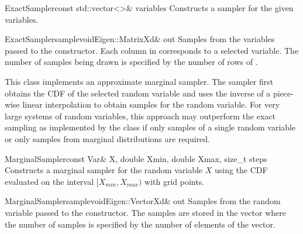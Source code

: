 \documentclass[a4paper, 10pt]{paper}
\begin{document}
\begin{classsyn}{ExactSampler}{const std::vector<>\& variables}
Constructs a sampler for the given variables.
\end{classsyn}

\begin{defmeth}{ExactSampler}{sample}{void}{Eigen::MatrixXd\& out}
Samples from the variables passed to the constructor. Each column in  corresponds to a 
selected variable. The number of samples being drawn is specified by the number of rows of .
\end{defmeth}


This class implements an approximate marginal sampler. The sampler first obtains the CDF of the selected random variable and 
uses the inverse of a piece-wise linear interpolation to obtain samples for the random variable. For very large systems of random 
variables, this approach may outperform the exact sampling as implemented by the  class if only samples 
of a single random variable or only samples from marginal distributions are required.

\begin{classsyn}{MarginalSampler}{const Var\& X, double Xmin, double Xmax, size\_t steps}
Constructs a marginal sampler for the random variable $X$ using the CDF evaluated on the interval $[X_{min},X_{max})$ 
with  grid points.
\end{classsyn}

\begin{defmeth}{MarginalSampler}{sample}{void}{Eigen::VectorXd\& out}
Samples from the random variable passed to the constructor. The samples are stored in the  vector where
the number of samples is specified by the number of elements of the vector.
\end{defmeth}
\end{document}
